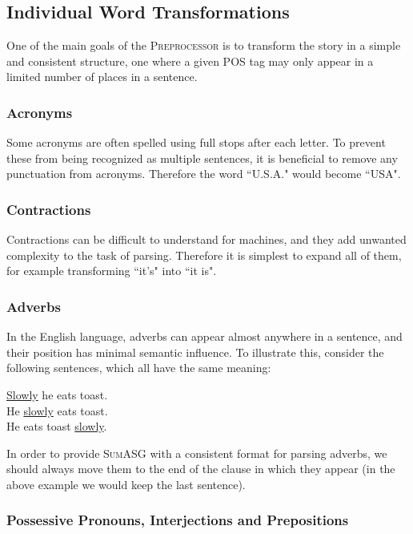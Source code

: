 \subsection{Individual Word Transformations}

One of the main goals of the \textsc{Preprocessor} is to transform the story in a simple and consistent structure, one where a given POS tag may only appear in a limited number of places in a sentence.

\subsubsection{Acronyms}

Some acronyms are often spelled using full stops after each letter. To prevent these from being recognized as multiple sentences, it is beneficial to remove any punctuation from acronyms. Therefore the word ``U.S.A." would become ``USA".

\subsubsection{Contractions}

Contractions can be difficult to understand for machines, and they add unwanted complexity to the task of parsing. Therefore it is simplest to expand all of them, for example transforming ``it's" into ``it is".

\subsubsection{Adverbs}

In the English language, adverbs can appear almost anywhere in a sentence, and their position has minimal semantic influence. To illustrate this, consider the following sentences, which all have the same meaning:

\begin{displayquote}
\underline{Slowly} he eats toast. \\
He \underline{slowly} eats toast. \\
He eats toast \underline{slowly}.
\end{displayquote}

In order to provide \textsc{SumASG} with a consistent format for parsing adverbs, we should always move them to the end of the clause in which they appear (in the above example we would keep the last sentence).

\subsubsection{Possessive Pronouns, Interjections and Prepositions}

